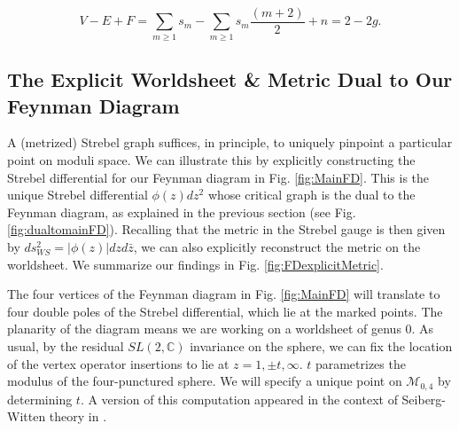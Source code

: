 \documentclass[english]{article}
\renewcommand{\>}{\rangle}
\newcommand{\<}{\langle}
\renewcommand{\(}{\left(}
\renewcommand{\)}{\right)}
\begin{document}
\begin{equation}
     V-E+F = \sum_{m \geq 1} s_{m} -    \sum_{m \geq 1} s_{m} \frac{(m+2)}{2} + n = 2-2g .
\end{equation}



\subsection{The Explicit Worldsheet \& Metric Dual to Our Feynman Diagram} \label{sec:ExplicitWS}

A (metrized) Strebel graph suffices, in principle, to uniquely pinpoint a particular point on moduli space. We can illustrate this by explicitly constructing the Strebel differential for our Feynman diagram in Fig. \ref{fig:MainFD}. 
This is the unique Strebel differential $\phi(z)dz^2$ whose critical graph is the dual to the Feynman diagram, as explained in the previous section (see Fig. \ref{fig:dualtomainFD}). 
Recalling that the metric in the Strebel gauge is then given by $ds_{WS}^2=|\phi(z)|dzd\bar{z}$,  we can also explicitly reconstruct the metric on the worldsheet. We summarize our findings in Fig. \ref{fig:FDexplicitMetric}.


 The four vertices of the Feynman diagram in Fig. \ref{fig:MainFD} will translate to four double poles of the Strebel differential, which lie at the marked points. The planarity of the diagram means we are working on a worldsheet of genus 0. As usual, by the residual $SL(2,\mathbb{C})$ invariance on the sphere, we can fix the location of the vertex operator insertions to lie at $z=1,\pm t,\infty$. $t$ parametrizes the modulus of the four-punctured sphere. We will specify a unique point on $\mathcal{M}_{0,4}$ by determining $t$. A version of this computation appeared in the context of Seiberg-Witten theory in \cite{IntegerStrebs}.
\end{document}
